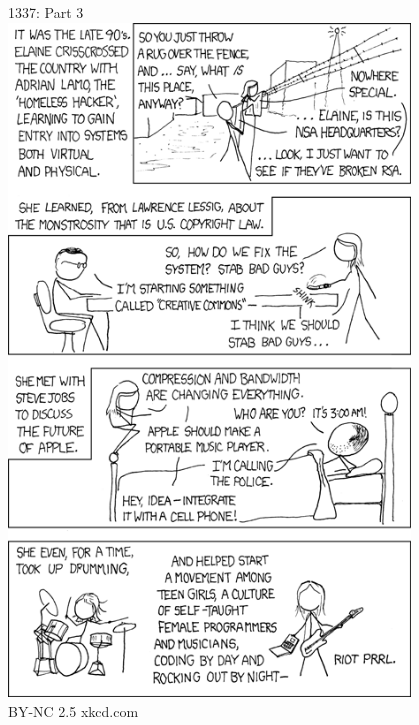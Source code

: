 \documentclass[a6paper,fontsize=10pt,twoside,open=right]{scrbook}
\begin{document}

\newpage

\newpage

\vspace{15pt}

\vspace{15pt}

\vspace*{-10pt}
\newpage

\newpage

\vspace{15pt}

\newpage

\vspace{15pt}

\newpage

\newpage
\null
\vfill
\vspace*{-10pt}
\begin{center}
  \tiny{1337: Part 3}\\
  \includegraphics[keepaspectratio,width=0.8\textwidth]{elements/images/1337_part_3.png}\\
  \tiny{BY-NC 2.5 xkcd.com}
\end{center}\par
\end{document}
